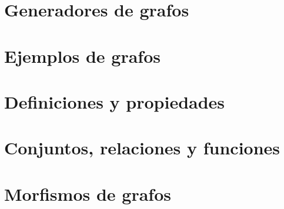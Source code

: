 
\section{Generadores de grafos}


\section{Ejemplos de grafos}


\section{Definiciones y propiedades}


\section{Conjuntos, relaciones y funciones}


\section{Morfismos de grafos}


